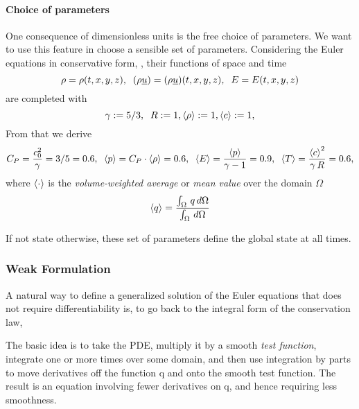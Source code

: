 \paragraph{Choice of parameters} One consequence of dimensionless units is the
free choice of parameters. We want to use this feature in choose a sensible set
of parameters.  Considering the Euler equations in conservative form,
, their functions of space and time
\begin{equation}
\rho = \rho(t,x,y,z), \;\;(\rho\underline{u}) = (\rho\underline{u})(t,x,y,z),\;\;E = E(t,x,y,z)
\end{equation}
are completed with
\begin{equation}
\label{eqn:parameter-choice-completion}
\gamma := 5/3,\;\;R := 1, \langle\rho\rangle := 1,\langle c\rangle := 1,
\end{equation}
From that we derive
\begin{equation}
C_P = \frac{c_0^2}{\gamma} = 3/5 = 0.6,\;\;
\langle p\rangle = C_P\cdot\langle\rho\rangle = 0.6,\;\;
\langle E\rangle = \frac{\langle p\rangle}{\gamma -1} = 0.9,\;\;
\langle T\rangle = \frac{\left\langle c\right\rangle^2}{\gamma\,R} = 0.6,
\end{equation}
where $\left\langle\cdot\right\rangle$ is the \emph{volume-weighted average} or \emph{mean value}
over the domain $\Omega$
\begin{equation}
\label{eqn:domain-average}
    \left\langle q\right\rangle = \frac{\int_\Omega\,q\,d\Omega}{\int_\Omega\,d\Omega}
\end{equation}

If not state otherwise, these set of parameters define the global state at all times.

\subsubsection{Weak Formulation}
A natural way to define a generalized solution of the Euler equations that does
not require differentiability is, to go back to the integral form of the
conservation law,

The basic idea is to take the PDE, multiply it by a smooth \emph{test function},
integrate one or more times over some domain, and then use integration by parts
to move derivatives off the function q and onto the smooth test function. The
result is an equation involving fewer derivatives on q, and hence requiring
less smoothness.

